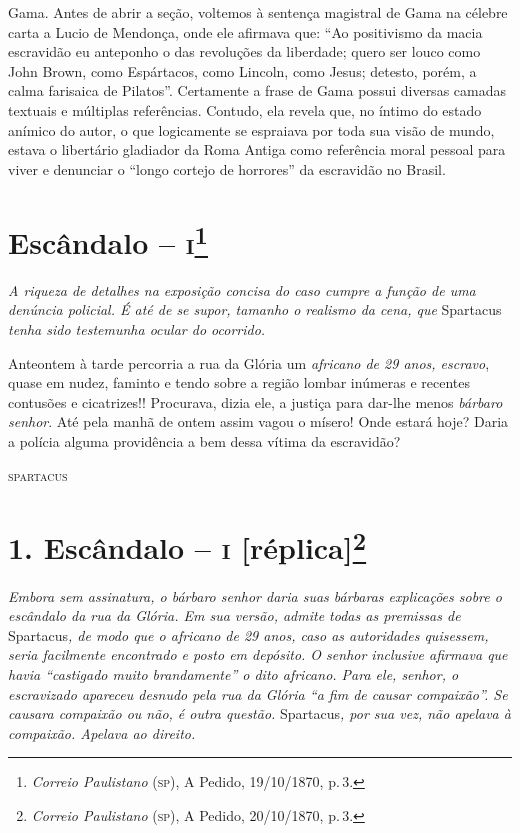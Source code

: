 \begin{argumento}
{Gama. Antes de abrir a seção, voltemos à sentença magistral de Gama na
célebre carta a Lucio de Mendonça, onde ele afirmava que: ``Ao
positivismo da macia escravidão eu anteponho o das revoluções da
liberdade; quero ser louco como John Brown, como Espártacos, como
Lincoln, como Jesus; detesto, porém, a calma farisaica de Pilatos''.
Certamente a frase de Gama possui diversas camadas textuais e múltiplas
referências. Contudo, ela revela que, no íntimo do estado anímico do
autor, o que logicamente se espraiava por toda sua visão de mundo,
estava o libertário gladiador da Roma Antiga como referência moral
pessoal para viver e denunciar o ``longo cortejo de horrores'' da
escravidão no Brasil.}
\end{argumento}

\chapter{Escândalo -- \textsc{i}\footnote{\emph{Correio Paulistano} (\textsc{sp}), A Pedido, 19/10/1870,
  p.\,3.}} %

\begin{didascalia}
\emph{A riqueza de detalhes na exposição concisa do caso cumpre a função
de uma denúncia policial. É até de se supor, tamanho o realismo da cena,
que} Spartacus \emph{tenha sido testemunha ocular do ocorrido.}
\end{didascalia}

Anteontem à tarde percorria a rua da Glória um \emph{africano de 29
anos, escravo}, quase em nudez, faminto e tendo sobre a região lombar
inúmeras e recentes contusões e cicatrizes!! Procurava, dizia ele, a
justiça para dar-lhe menos \emph{bárbaro senhor}. Até pela manhã de
ontem assim vagou o mísero! Onde estará hoje? Daria a polícia alguma
providência a bem dessa vítima da escravidão?

\begin{flushright}
\textsc{spartacus}
\end{flushright}

\chapter{1. Escândalo -- \textsc{i} {[}réplica{]}\footnote{\emph{Correio Paulistano} (\textsc{sp}), A Pedido, 20/10/1870,
  p.\,3.}} %

\begin{didascalia}
\emph{Embora sem assinatura, o bárbaro senhor daria suas bárbaras
explicações sobre o escândalo da rua da Glória. Em sua versão, admite
todas as premissas de} Spartacus\emph{, de modo que o africano de 29
anos, caso as autoridades quisessem, seria facilmente encontrado e posto
em depósito. O senhor inclusive afirmava que havia ``castigado muito
brandamente'' o dito africano. Para ele, senhor, o escravizado apareceu
desnudo pela rua da Glória ``a fim de causar compaixão''. Se causara
compaixão ou não, é outra questão.} Spartacus\emph{, por sua vez, não
apelava à compaixão. Apelava ao direito.}
\end{didascalia}


